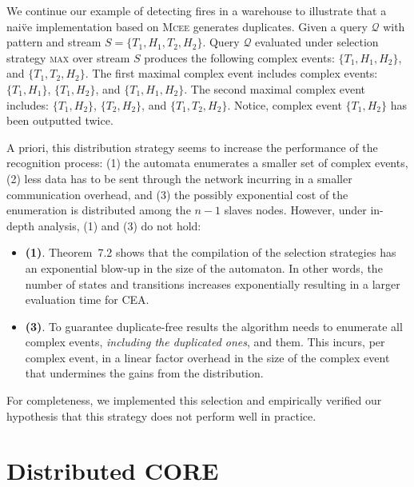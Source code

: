 \begin{example}\label{example:3}
  We continue our example of detecting fires in a warehouse to illustrate that a nai\"ve implementation based on \textsc{Mcee} generates duplicates. Given a query $\mathcal{Q}$ with pattern  and stream $S = \{ T_{1}, H_{1}, T_{2}, H_{2}\}$. Query $\mathcal{Q}$ evaluated under selection strategy \textsc{max} over stream $S$ produces the following complex events: $\{T_{1}, H_{1}, H_{2}\}$, and $\{T_{1}, T_{2}, H_{2}\}$. The first maximal complex event includes complex events: $\{T_{1}, H_{1}\}$, $\{T_{1}, H_{2}\}$, and $\{T_{1}, H_{1}, H_{2}\}$. The second maximal complex event includes: $\{T_{1}, H_{2}\}$, $\{T_{2}, H_{2}\}$, and $\{T_{1}, T_{2}, H_{2}\}$. Notice, complex event $\{T_{1}, H_{2}\}$ has been outputted twice.
\end{example}

A priori, this distribution strategy seems to increase the performance of the recognition process: (1) the automata enumerates a smaller set of complex events, (2) less data has to be sent through the network incurring in a smaller communication overhead, and (3) the possibly exponential cost of the enumeration is distributed among the $n - 1$ slaves nodes. However, under in-depth analysis, (1) and (3) do not hold:

\begin{itemize}
  \item[] \textbf{(1)}. Theorem~7.2 \cite{formal-framework-cer} shows that the compilation of the selection strategies has an exponential blow-up in the size of the automaton. In other words, the number of states and transitions increases exponentially resulting in a larger evaluation time for CEA.

  \item[] \textbf{(3)}. To guarantee duplicate-free results the algorithm needs to enumerate all complex events, \emph{including the duplicated ones}, and them. This incurs, per complex event, in a linear factor overhead in the size of the complex event that undermines the gains from the distribution.
\end{itemize}

For completeness, we implemented this selection and empirically verified our hypothesis that this strategy does not perform well in practice.

\section{Distributed CORE}\label{sec:dcore}

